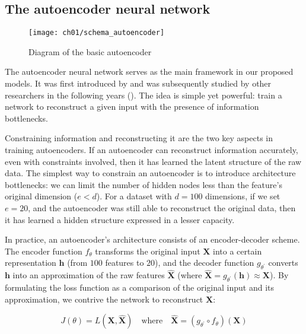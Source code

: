 \subsection{The autoencoder neural network}

\begin{wrapfigure}{r}{0.5\textwidth}
  \centering
  \texttt{[image: ch01/schema\_autoencoder]}
  \caption[Diagram of the basic autoencoder]{
      Diagram of the basic autoencoder
  }
  \label{schema:autoencoder}
\end{wrapfigure}

\par The autoencoder neural network serves as the main framework in our
proposed models.  It was first introduced by \cite{lecun1987phd} and
was subsequently studied by other researchers in the following years
(\cite{bourlard1988auto, hinton1994autoencoders}). The idea is simple yet
powerful: train a network to reconstruct a given input with the
presence of information bottlenecks.

\par Constraining information and reconstructing it are the two key aspects in
training autoencoders. If an autoencoder can reconstruct information
accurately, even with constraints involved, then it has learned the latent
structure of the raw data. The simplest way to constrain an autoencoder is to
introduce architecture bottlenecks: we can limit the number of hidden nodes
less than the feature's original dimension ($e<d$). For a dataset with
$d=100$ dimensions, if we set $e=20$, and the autoencoder was still able to
reconstruct the original data, then it has learned a hidden structure expressed
in a lesser capacity.

\par In practice, an autoencoder's architecture consists of an encoder-decoder
scheme. The encoder function $f_{\theta}$ transforms the original input
$\mathbf{X}$ into a certain representation $\mathbf{h}$ (from $100$ features to
$20$), and the decoder function $g_{\theta^{\prime}}$ converts $\mathbf{h}$
into an approximation of the raw features $\mathbf{\widehat{X}}$ (where
$\mathbf{\widehat{X}} = g_{\theta^{\prime}}(\mathbf{h}) \approx \mathbf{X}$).
By formulating the loss function as a comparison of the original input and its
approximation, we  contrive the network to reconstruct $\mathbf{X}$:

\[
    J(\theta) = L(\mathbf{X}, \mathbf{\widehat{X}}) \quad \text{where} \quad
    \mathbf{\widehat{X}} = (g_{\theta^{\prime}} \circ f_{\theta}) (\mathbf{X})
\]

